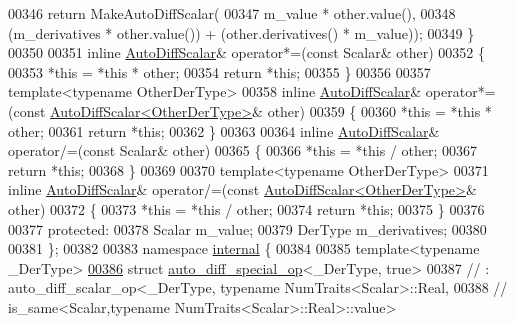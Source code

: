 \begin{DoxyCode}
00346       \textcolor{keywordflow}{return} MakeAutoDiffScalar(
00347         m\_value * other.value(),
00348         (m\_derivatives * other.value()) + (other.derivatives() * m\_value));
00349     \}
00350 
00351     \textcolor{keyword}{inline} \hyperlink{class_eigen_1_1_auto_diff_scalar}{AutoDiffScalar}& operator*=(\textcolor{keyword}{const} Scalar& other)
00352     \{
00353       *\textcolor{keyword}{this} = *\textcolor{keyword}{this} * other;
00354       \textcolor{keywordflow}{return} *\textcolor{keyword}{this};
00355     \}
00356 
00357     \textcolor{keyword}{template}<\textcolor{keyword}{typename} OtherDerType>
00358     \textcolor{keyword}{inline} \hyperlink{class_eigen_1_1_auto_diff_scalar}{AutoDiffScalar}& operator*=(\textcolor{keyword}{const} 
      \hyperlink{class_eigen_1_1_auto_diff_scalar}{AutoDiffScalar<OtherDerType>}& other)
00359     \{
00360       *\textcolor{keyword}{this} = *\textcolor{keyword}{this} * other;
00361       \textcolor{keywordflow}{return} *\textcolor{keyword}{this};
00362     \}
00363 
00364     \textcolor{keyword}{inline} \hyperlink{class_eigen_1_1_auto_diff_scalar}{AutoDiffScalar}& operator/=(\textcolor{keyword}{const} Scalar& other)
00365     \{
00366       *\textcolor{keyword}{this} = *\textcolor{keyword}{this} / other;
00367       \textcolor{keywordflow}{return} *\textcolor{keyword}{this};
00368     \}
00369 
00370     \textcolor{keyword}{template}<\textcolor{keyword}{typename} OtherDerType>
00371     \textcolor{keyword}{inline} \hyperlink{class_eigen_1_1_auto_diff_scalar}{AutoDiffScalar}& operator/=(\textcolor{keyword}{const} 
      \hyperlink{class_eigen_1_1_auto_diff_scalar}{AutoDiffScalar<OtherDerType>}& other)
00372     \{
00373       *\textcolor{keyword}{this} = *\textcolor{keyword}{this} / other;
00374       \textcolor{keywordflow}{return} *\textcolor{keyword}{this};
00375     \}
00376 
00377   \textcolor{keyword}{protected}:
00378     Scalar m\_value;
00379     DerType m\_derivatives;
00380 
00381 \};
00382 
00383 \textcolor{keyword}{namespace }\hyperlink{namespaceinternal}{internal} \{
00384 
00385 \textcolor{keyword}{template}<\textcolor{keyword}{typename} \_DerType>
\hyperlink{struct_eigen_1_1internal_1_1auto__diff__special__op_3_01___der_type_00_01true_01_4}{00386} \textcolor{keyword}{struct }\hyperlink{struct_eigen_1_1internal_1_1auto__diff__special__op}{auto\_diff\_special\_op}<\_DerType, true>
00387 \textcolor{comment}{//   : auto\_diff\_scalar\_op<\_DerType, typename NumTraits<Scalar>::Real,}
00388 \textcolor{comment}{//                            is\_same<Scalar,typename NumTraits<Scalar>::Real>::value>}

\end{DoxyCode}
